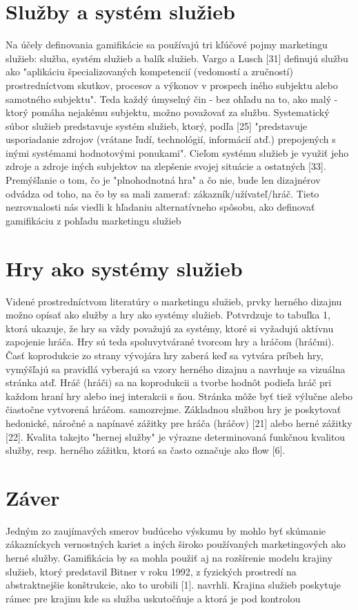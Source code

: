 \documentclass[10pt,twoside,slovak,a4paper]{article}
\begin{document}
\section{Služby a systém služieb} \label{dolezita}
Na účely definovania gamifikácie sa používajú tri kľúčové pojmy
marketingu služieb: služba, systém služieb a
balík služieb.
Vargo a Lusch [31] definujú službu ako "aplikáciu
špecializovaných kompetencií (vedomostí a zručností) prostredníctvom skutkov,
procesov a výkonov v prospech iného subjektu alebo
samotného subjektu". Teda každý úmyselný čin - bez ohľadu na to, ako malý -
ktorý pomáha nejakému subjektu, možno považovať za službu.
Systematický súbor služieb predstavuje systém služieb, ktorý,
podľa [25] "predstavuje usporiadanie zdrojov (vrátane
ľudí, technológií, informácií atď.) prepojených s inými systémami
hodnotovými ponukami". Cieľom systému služieb je využiť jeho
zdroje a zdroje iných subjektov na zlepšenie svojej situácie
a ostatných [33]. 
Premýšľanie o tom, čo je "plnohodnotná hra" a čo nie, bude len
dizajnérov odvádza od toho, na čo by sa mali zamerať:
zákazník/užívateľ/hráč.
Tieto nezrovnalosti nás viedli k hľadaniu alternatívneho spôsobu, ako
definovať gamifikáciu z pohľadu marketingu služieb



\section{Hry ako systémy služieb} \label{dolezitejsia}
 Videné prostredníctvom literatúry o marketingu služieb,
prvky herného dizajnu možno opísať ako služby a hry ako
systémy služieb. Potvrdzuje to tabuľka 1, ktorá ukazuje, že
hry sa vždy považujú za systémy, ktoré si vyžadujú aktívnu
zapojenie hráča.
Hry sú teda spoluvytvárané tvorcom hry a
hráčom (hráčmi). Časť koprodukcie zo strany vývojára hry zaberá
keď sa vytvára príbeh hry, vymýšľajú sa pravidlá
vyberajú sa vzory herného dizajnu a navrhuje sa vizuálna stránka atď. Hráč (hráči)
sa na koprodukcii a tvorbe hodnôt podieľa hráč
pri každom hraní hry alebo inej interakcii s ňou. Stránka
môže byť tiež výlučne alebo čiastočne vytvorená hráčom.
samozrejme. Základnou službou hry je poskytovať hedonické,
náročné a napínavé zážitky pre hráča (hráčov) [21] alebo
herné zážitky [22]. Kvalita takejto "hernej služby" je
výrazne determinovaná funkčnou kvalitou služby, resp.
herného zážitku, ktorá sa často označuje ako flow [6]. 



\section{Záver} \label{zaver} %
Jedným zo zaujímavých smerov budúceho výskumu by mohlo byť skúmanie
zákazníckych vernostných kariet a iných široko používaných marketingových
ako herné služby. Gamifikácia by sa mohla použiť aj
na rozšírenie modelu krajiny služieb, ktorý predstavil Bitner v roku 1992,
z fyzických prostredí na abstraktnejšie konštrukcie, ako to urobili [1].
navrhli. Krajina služieb poskytuje rámec pre krajinu
kde sa služba uskutočňuje a ktorá je pod kontrolou




\end{document}

